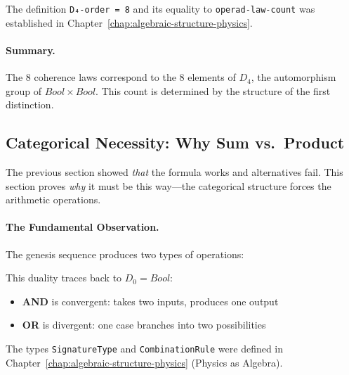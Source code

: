 \documentclass[11pt,a4paper]{book}
\def\text#1{#1}%
\begin{document}
The definition \verb|D₄-order = 8| and its equality to \verb|operad-law-count| 
was established in Chapter~\ref{chap:algebraic-structure-physics}.

\paragraph{Summary.}

The 8 coherence laws correspond to the 8 elements of $D_4$, the automorphism group of 
$\text{Bool} \times \text{Bool}$. This count is determined by the structure of the 
first distinction.

\subsection{Categorical Necessity: Why Sum vs.\ Product}
\label{sec:alpha-categorical-necessity}

The previous section showed \emph{that} the formula works and alternatives fail.
This section proves \emph{why} it must be this way---the categorical 
structure forces the arithmetic operations.

\paragraph{The Fundamental Observation.}

The genesis sequence produces two types of operations:

\begin{center}
\end{center}

This duality traces back to $D_0 = \text{Bool}$:

\begin{itemize}
\item \textbf{AND} is convergent: takes two inputs, produces one output
\item \textbf{OR} is divergent: one case branches into two possibilities
\end{itemize}

The types \verb|SignatureType| and \verb|CombinationRule| were defined in 
Chapter~\ref{chap:algebraic-structure-physics} (Physics as Algebra).
\end{document}
